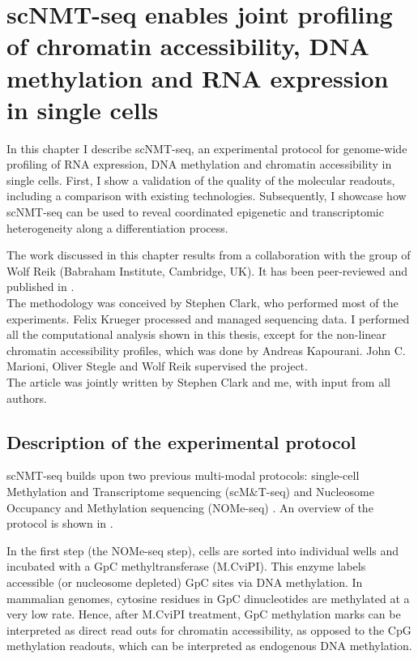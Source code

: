 
\section{scNMT-seq enables joint profiling of chromatin accessibility, DNA methylation and RNA expression in single cells}

\graphicspath{{Chapter1/Figs/}}

In this chapter I describe scNMT-seq, an experimental protocol for genome-wide profiling of RNA expression, DNA methylation and chromatin accessibility in single cells. First, I show a validation of the quality of the molecular readouts, including a comparison with existing technologies. Subsequently, I showcase how scNMT-seq can be used to reveal coordinated epigenetic and transcriptomic heterogeneity along a differentiation process.

The work discussed in this chapter results from a collaboration with the group of Wolf Reik (Babraham Institute, Cambridge, UK). It has been peer-reviewed and published in \cite{Clark2018}.\\
The methodology was conceived by Stephen Clark, who performed most of the experiments. Felix Krueger processed and managed sequencing data. I performed all the computational analysis shown in this thesis, except for the non-linear chromatin accessibility profiles, which was done by Andreas Kapourani. John C. Marioni, Oliver Stegle and Wolf Reik supervised the project.\\
The article was jointly written by Stephen Clark and me, with input from all authors.


\subsection{Description of the experimental protocol} \label{section:scnmt_protocol}

scNMT-seq builds upon two previous multi-modal protocols: single-cell Methylation and Transcriptome sequencing (scM\&T-seq) \cite{Angermueller2016} and Nucleosome Occupancy and Methylation sequencing (NOMe-seq) \cite{Kelly2012,Pott2016}. An overview of the protocol is shown in .

In the first step (the NOMe-seq step), cells are sorted into individual wells and incubated with a GpC methyltransferase (M.CviPI). This enzyme labels accessible (or nucleosome depleted) GpC sites via DNA methylation\cite{Kilgore2007, Kelly2012}. In mammalian genomes, cytosine residues in GpC dinucleotides are methylated at a very low rate. Hence, after M.CviPI treatment, GpC methylation marks can be interpreted as direct read outs for chromatin accessibility, as opposed to the CpG methylation readouts, which can be interpreted as endogenous DNA methylation\cite{Kilgore2007, Kelly2012}.

